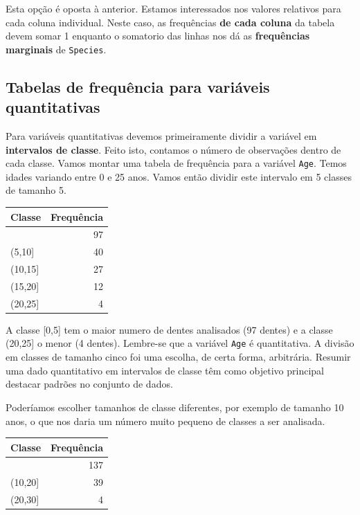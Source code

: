 \documentclass[
]{book}
\begin{document}
Esta opção é oposta à anterior. Estamos interessados nos valores relativos para cada coluna individual. Neste caso, as frequências \textbf{de cada coluna} da tabela devem somar 1 enquanto o somatorio das linhas nos dá as \textbf{frequências marginais} de \texttt{Species}.

\hypertarget{tabelas-de-frequuxeancia-para-variuxe1veis-quantitativas}{%
\subsection{Tabelas de frequência para variáveis quantitativas}\label{tabelas-de-frequuxeancia-para-variuxe1veis-quantitativas}}

Para variáveis quantitativas devemos primeiramente dividir a variável em \textbf{intervalos de classe}. Feito isto, contamos o número de observações dentro de cada classe. Vamos montar uma tabela de frequência para a variável \texttt{Age}. Temos idades variando entre 0 e 25 anos. Vamos então dividir este intervalo em 5 classes de tamanho 5.

\begin{tabular}{l|r}
\hline
Classe & Frequência\\
\hline
[0,5] & 97\\
\hline
(5,10] & 40\\
\hline
(10,15] & 27\\
\hline
(15,20] & 12\\
\hline
(20,25] & 4\\
\hline
\end{tabular}

A classe {[}0,5{]} tem o maior numero de dentes analisados (97 dentes) e a classe (20,25{]} o menor (4 dentes). Lembre-se que a variável \texttt{Age} é quantitativa. A divisão em classes de tamanho cinco foi uma escolha, de certa forma, arbitrária. Resumir uma dado quantitativo em intervalos de classe têm como objetivo principal destacar padrões no conjunto de dados.

Poderíamos escolher tamanhos de classe diferentes, por exemplo de tamanho 10 anos, o que nos daria um número muito pequeno de classes a ser analisada.

\begin{tabular}{l|r}
\hline
Classe & Frequência\\
\hline
[0,10] & 137\\
\hline
(10,20] & 39\\
\hline
(20,30] & 4\\
\hline
\end{tabular}
\end{document}
